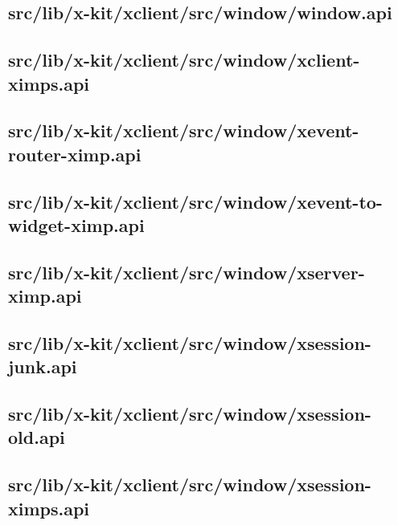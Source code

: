 \subsection{src/lib/x-kit/xclient/src/window/window.api}


\subsection{src/lib/x-kit/xclient/src/window/xclient-ximps.api}


\subsection{src/lib/x-kit/xclient/src/window/xevent-router-ximp.api}


\subsection{src/lib/x-kit/xclient/src/window/xevent-to-widget-ximp.api}


\subsection{src/lib/x-kit/xclient/src/window/xserver-ximp.api}


\subsection{src/lib/x-kit/xclient/src/window/xsession-junk.api}


\subsection{src/lib/x-kit/xclient/src/window/xsession-old.api}


\subsection{src/lib/x-kit/xclient/src/window/xsession-ximps.api}


